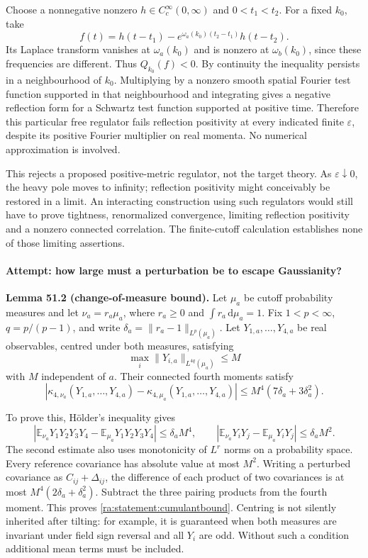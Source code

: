 \documentclass[11pt]{article}
\newcommand{\E}{\mathbb{E}}
\newcommand{\dd}{\,\mathrm d}
\begin{document}
Choose a nonnegative nonzero $h\in C_c^\infty(0,\infty)$ and $0<t_1<t_2$.
For a fixed $k_0$, take
\[
 f(t)=h(t-t_1)-e^{\omega_a(k_0)(t_2-t_1)}h(t-t_2).
\]
Its Laplace transform vanishes at $\omega_a(k_0)$ and is nonzero at
$\omega_b(k_0)$, since these frequencies are different. Thus
$Q_{k_0}(f)<0$. By continuity the inequality persists in a neighbourhood
of $k_0$. Multiplying by a nonzero smooth spatial Fourier test function
supported in that neighbourhood and integrating gives a negative
reflection form for a Schwartz test function supported at positive time.
Therefore this particular free regulator fails reflection positivity at
every indicated finite $\varepsilon$, despite its positive Fourier
multiplier on real momenta. No numerical approximation is involved.

This rejects a proposed positive-metric regulator, not the target theory.
As $\varepsilon\downarrow0$, the heavy pole moves to infinity; reflection
positivity might conceivably be restored in a limit. An interacting
construction using such regulators would still have to prove tightness,
renormalized convergence, limiting reflection positivity and a nonzero
connected correlation. The finite-cutoff calculation establishes none of
those limiting assertions.

\paragraph{Attempt: how large must a perturbation be to escape Gaussianity?}
\textbf{Lemma 51.2 (change-of-measure bound).} Let $\mu_a$ be cutoff
probability measures and let $\nu_a=r_a\mu_a$, where $r_a\ge0$ and
$\int r_a\dd\mu_a=1$. Fix $1<p<\infty$, $q=p/(p-1)$, and write
$\delta_a=\|r_a-1\|_{L^p(\mu_a)}$. Let $Y_{1,a},\ldots,Y_{4,a}$ be real
observables, centred under both measures, satisfying
\[
 \max_i\|Y_{i,a}\|_{L^{4q}(\mu_a)}\le M
\]
with $M$ independent of $a$. Their connected fourth moments satisfy
\begin{equation}\label{ra:statement:cumulantbound}
 |\kappa_{4,\nu_a}(Y_{1,a},\ldots,Y_{4,a})
       -\kappa_{4,\mu_a}(Y_{1,a},\ldots,Y_{4,a})|
 \le M^4(7\delta_a+3\delta_a^2).
\end{equation}

To prove this, H\"older's inequality gives
\[
 |\E_{\nu_a}Y_1Y_2Y_3Y_4-\E_{\mu_a}Y_1Y_2Y_3Y_4|
 \le\delta_a M^4,
 \qquad
 |\E_{\nu_a}Y_iY_j-\E_{\mu_a}Y_iY_j|
 \le\delta_a M^2.
\]
The second estimate also uses monotonicity of $L^r$ norms on a probability
space. Every reference covariance has absolute value at most $M^2$.
Writing a perturbed covariance as $C_{ij}+\Delta_{ij}$, the difference of
each product of two covariances is at most
$M^4(2\delta_a+\delta_a^2)$. Subtract the three pairing products from the
fourth moment. This proves \eqref{ra:statement:cumulantbound}. Centring is not
silently inherited after tilting: for example, it is guaranteed when both
measures are invariant under field sign reversal and all $Y_i$ are odd.
Without such a condition additional mean terms must be included.
\end{document}
